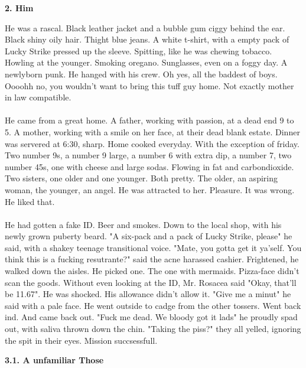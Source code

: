 \documentclass[]{article}
\begin{document}
\begin{center}
	\large\textbf{2. Him}
\end{center}

He was a rascal. Black leather jacket and a bubble gum ciggy behind the ear. Black shiny oily hair. Thight blue jeans. A white t-shirt, with a empty pack of Lucky Strike pressed up the sleeve. Spitting, like he was chewing tobacco. Howling at the younger. Smoking oregano. Sunglasses, even on a foggy day. A newlyborn punk. He hanged with his crew. Oh yes, all the baddest of boys. Oooohh no, you wouldn't want to bring this tuff guy home. Not exactly mother in law compatible. 
\\ \\
He came from a great home. A father, working with passion, at a dead end 9 to 5. A mother, working with a smile on her face, at their dead blank estate. Dinner was servered at 6:30, sharp. Home cooked everyday. With the exception of friday. Two number 9s, a number 9 large, a number 6 with extra dip, a number 7, two number 45s, one with cheese and large sodas. Flowing in fat and carbondioxide. Two sisters, one older and one younger. Both pretty. The older, an aspiring woman, the younger, an angel. He was attracted to her. Pleasure. It was wrong. He liked that.
\\ \\
He had gotten a fake ID. Beer and smokes. Down to the local shop, with his newly grown puberty beard. "A six-pack and a pack of Lucky Strike, please" he said, with a shakey teenage transitional voice. "Mate, you gotta get it ya'self. You think this is a fucking resutrante?" said the acne harassed cashier. Frightened, he walked down the aisles. He picked one. The one with mermaids. Pizza-face didn't scan the goods. Without even looking at the ID, Mr. Rosacea said "Okay, that'll be 11.67". He was shocked. His allowance didn't allow it. "Give me a minut" he said with a pale face. He went outside to cadge from the other tossers. Went back ind. And came back out. "Fuck me dead. We bloody got it lads" he proudly spad out, with saliva thrown down the chin. "Taking the piss?" they all yelled, ignoring the spit in their eyes. Mission succsessfull.

\newpage

\begin{center}
	\textbf{3.1. A unfamiliar Those}
\end{center}
\end{document}
